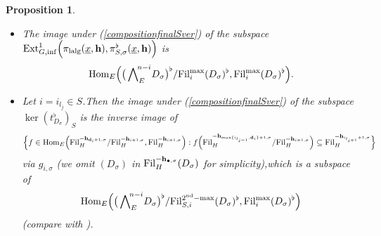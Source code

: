 \documentclass[10pt]{article}
\newtheorem{pro}[thm]{Proposition}
\newcommand{\fil}{{\rm Fil}}
\newcommand{\homo}{{\rm Hom}}
\newcommand{\ext}{{\rm Ext}}
\newcommand{\lalg}{{\rm lalg}}
\newcommand{\gr}{{\rm gr}}
\newcommand{\bh}{{\mathbf{h}}}
\newcommand{\bd}{{\mathbf{d}}}
\newcommand{\cS}{\mathcal S}
\begin{document}
\begin{pro}\label{propfor2ndfil}
	\begin{itemize}
		\item[(1)] The  image under (\ref{compositionfinalSver}) of the subspace $\ext^1_{G,\mathrm{inf}}\Big(\pi_{\lalg}(\underline{x},\bh),\pi^{\flat}_{S,\sigma}(\underline{x},\bh)\Big)$  is 
		\[\homo_E\Big(\big(\bigwedge\nolimits_{E}^{\!n-i}\!D_{\sigma}\big)^{\flat}/\fil_i^{\max}(D_{\sigma})^{\flat},\fil_i^{\max}(D_{\sigma})^{\flat}\Big).\]
		\item[(2)] Let $i=i_{l_j}\in S$.\;Then the  image under (\ref{compositionfinalSver}) of the subspace $\ker(t^{\flat}_{D_{\sigma}})_S$ is	the  inverse image of 
		\[\Big\{f\in\homo_E\Big(\fil_H^{-\bh_{\bd_i+1,\sigma}}/\fil_H^{-\bh_{i+1,\sigma}},\fil_H^{-\bh_{i+1,\sigma}}\Big):f\Big(\fil_H^{-\bh_{{\max\{i_{l_{j-1}},\bd_i\}}+1,\sigma}}/\fil_H^{-\bh_{i+1,\sigma}}\Big)\subseteq\fil_H^{-\bh_{i_{l_{j+1}}+1,\sigma}}\Big\}\]
		via $g_{i,\sigma}$ (we omit $(D_{\sigma})$ in $\fil_H^{-\bh_{\bullet,\sigma}}(D_{\sigma})$ for simplicity),\;which is a subspace of
		\[\homo_E\Big(\big(\bigwedge\nolimits_{E}^{\!n-i}\!D_{\sigma}\big)^{\flat}/\fil_{S,i}^{2^{\mathrm{nd}}-\max}(D_{\sigma})^{\flat},\fil_i^{\max}(D_{\sigma})^{\flat}\Big)\]
		(compare with \cite[(99) \& (102)]{BDcritical25}).\;
	
	\end{itemize}
\end{pro}
\end{document}
